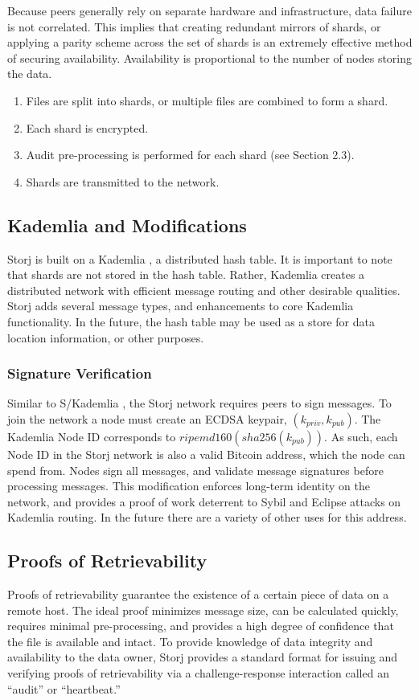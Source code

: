 \documentclass[a4paper,10pt]{article}
\begin{document}
Because peers generally rely on separate hardware and infrastructure, data failure is not correlated. This implies that creating redundant mirrors of shards, or applying a parity scheme across the set of shards is an extremely effective method of securing availability. Availability is proportional to the number of nodes storing the data.


\begin{enumerate}
\item Files are split into shards, or multiple files are combined to form a shard.
\item Each shard is encrypted.
\item Audit pre-processing is performed for each shard (see Section 2.3).
\item Shards are transmitted to the network.
\end{enumerate}

\subsection{Kademlia and Modifications}
Storj is built on a Kademlia \cite{2}, a distributed hash table. It is important to note that shards are not stored in the hash table. Rather, Kademlia creates a distributed network with efficient message routing and other desirable qualities. Storj adds several message types, and enhancements to core Kademlia functionality. In the future, the hash table may be used as a store for data location information, or other purposes.

\subsubsection{Signature Verification}
Similar to S/Kademlia \cite{3}, the Storj network requires peers to sign messages. To join the network a node must create an ECDSA keypair, $ (k_{priv}, k_{pub}) $. The Kademlia Node ID corresponds to $ ripemd160(sha256(k_{pub})) $. As such, each Node ID in the Storj network is also a valid Bitcoin address, which the node can spend from. Nodes sign all messages, and validate message signatures before processing messages. This modification enforces long-term identity on the network, and provides a proof of work deterrent to Sybil and Eclipse attacks on Kademlia routing. In the future there are a variety of other uses for this address.

\subsection{Proofs of Retrievability}
Proofs of retrievability guarantee the existence of a certain piece of data on a remote host. The ideal proof minimizes message size, can be calculated quickly, requires minimal pre-processing, and provides a high degree of confidence that the file is available and intact. To provide knowledge of data integrity and availability to the data owner, Storj provides a standard format for issuing and verifying proofs of retrievability via a challenge-response interaction called an “audit” or “heartbeat.”
\end{document}
